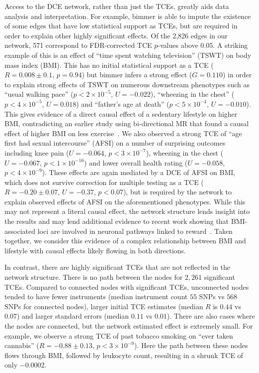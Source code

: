 \documentclass{article}
\begin{document}
Access to the DCE network, rather than just the TCEs, greatly aids data analysis and interpretation.
For example, bimmer is able to impute the existence of some edges that have low statistical
support as TCEs, but are required in order to explain other highly significant effects. Of the
2,826 edges in our network, 571 correspond to FDR-corrected TCE $p$-values above 0.05. A striking
example of this is an effect of ``time spent watching television'' (TSWT) on body mass index (BMI).
This has no initial statistical support as a TCE ($R = 0.008 \pm 0.1$, $p = 0.94$) but bimmer
infers a strong effect ($G = 0.110$) in order to explain strong effects of TSWT on numerous downstream
phenotypes such as ``usual walking pace'' ($p < 2 \times 10^{-5}$, $U = -0.022$),  ``wheezing in the chest''
($p < 4\times 10^{-5}$, $U = 0.018$) and ``father's age at death'' ($p < 5\times 10^{-4}$, $U = -0.010$).
This gives evidence of a direct causal effect of a sedentary lifestyle on higher BMI, contradicting
an earlier study using bi-directional MR that found a causal effect of
higher BMI on less exercise~\cite{Richmond2014}.
We also observed a strong TCE of ``age first had sexual intercourse'' (AFSI) on a number
of surprising outcomes including knee pain ($U = -0.064$, $p < 3 \times 10^{-7}$),
wheezing in the chest ($U = -0.067$, $p < 1 \times 10^{-16}$) and
lower overall health rating ($U = -0.058$, $p < 4 \times 10^{-9}$). These effects are again
mediated by a DCE of AFSI on BMI, which does not survive
correction for multiple testing as a TCE ($R = -0.20 \pm 0.07$, $U = -0.37$, $p < 0.07$),
but is required by the network to explain observed effects of AFSI on the aforementioned phenotypes.
While this may not represent a literal causal effect, the network structure lends
insight into the results and may lend additional evidence to recent work
showing that BMI-associated loci are involved
in neuronal pathways linked to reward~\cite{Ndiaye2020}. Taken together, we consider
this evidence of a complex relationship between BMI and lifestyle with causal effects
likely flowing in both directions.


In contrast, there are highly significant TCEs that are not reflected in
the network structure. There is no path between the nodes for $2,261$ significant TCEs.
Compared to connected nodes with significant TCEs, unconnected nodes tended to have fewer instruments
(median instrument count $55$ SNPs vs $568$ SNPs for connected nodes), larger initial
TCE estimates (median $R$ is $0.44$ vs $0.07$) and larger standard errors
(median $0.11$ vs $0.01$). There are also cases where the nodes are connected, but the network
estimated effect is extremely small.
For example, we observe a strong TCE of 
past tobacco smoking on ``ever taken cannabis'' ($R = -0.88 \pm 0.13$, $p < 3 \times 10^{-9}$).
Here the path between these nodes flows through BMI, followed by leukocyte count,
resulting in a shrunk TCE of only $-0.0002$.
 
\end{document}
